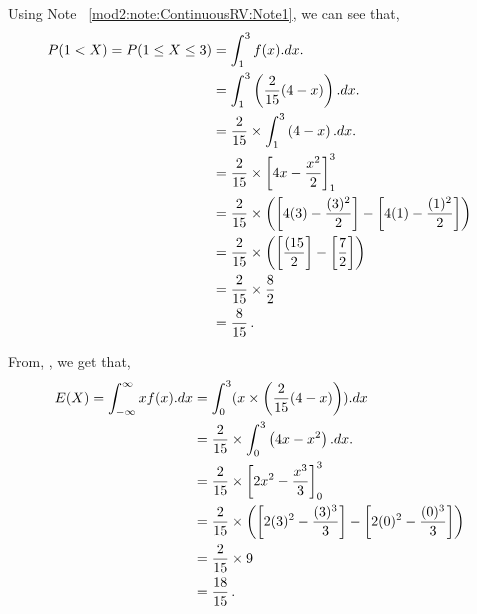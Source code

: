 \begin{subquestions}
\begin{subsubquestions}

\subsubquestion

Using Note ~\ref{mod2:note:ContinuousRV:Note1}, we can see that,
\begin{align}
	P(1<X) = P(1 \leq X \leq 3) & = \int_1^3 f(x).dx. \nonumber \\
	& = \int_1^3 \left(\frac{2}{15}(4-x)\right).dx. \nonumber \\
	& = \frac{2}{15} \times \int_1^3 \left(4-x\right).dx. \nonumber \\
	& = \frac{2}{15} \times \left[ 4x- \frac{x^2}{2}\right]^3_1 \nonumber \\
	& = \frac{2}{15} \times \left( \left[ 4(3)- \frac{(3)^2}{2}\right] -\left[ 4(1)- \frac{(1)^2}{2}\right] \right) \nonumber \\
	& = \frac{2}{15} \times \left( \left[\frac{(15}{2}\right] -\left[ \frac{7}{2}\right] \right) \nonumber \\
	& = \frac{2}{15} \times \frac{8}{2} \nonumber \\
	& = \frac{8}{15} \,.	
\end{align}
	

\subsubquestion

From, , we get that,
\begin{align}
	E(X) = \int_{-\infty}^{\infty}x f(x).dx & = \int_{0}^{3}(x \times \left( \frac{2}{15}(4-x)\right)).dx \nonumber \\
	                                        & = \frac{2}{15} \times \int_0^3 \left(4x-x^2 \right).dx. \nonumber \\
	                                        & = \frac{2}{15} \times \left[ 2x^2 - \frac{x^3}{3} \right]_0^3 \nonumber \\
	                                        & = \frac{2}{15} \times \left( \left[ 2(3)^2 - \frac{(3)^3}{3} \right] - \left[ 2(0)^2 - \frac{(0)^3}{3} \right] \right) \nonumber \\
	                                        & = \frac{2}{15} \times 9 \nonumber \\
	                                        & = \frac{18}{15} \,.
\end{align}


\subsubquestion


\end{subsubquestions}
\end{subquestions}
